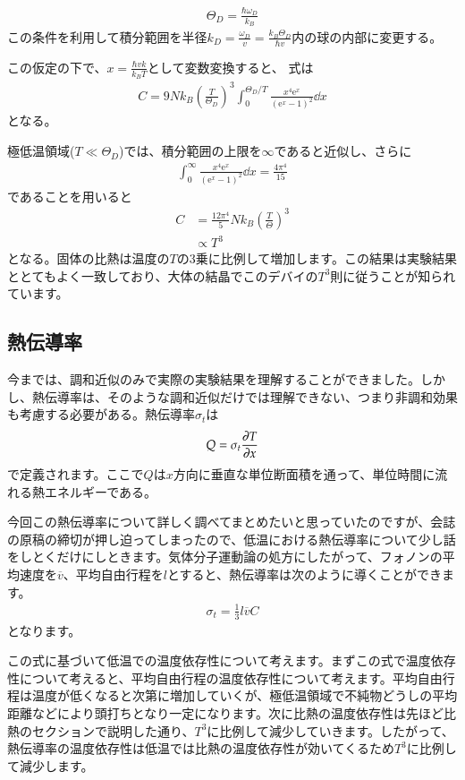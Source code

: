 \documentclass[10pt,b5paper,papersize,dvipdfmx]{jsbook}
\begin{document}
\begin{align}
  \Theta_D = \frac{\hbar \omega_D}{k_B}
\end{align}
この条件を利用して積分範囲を半径$k_D=\frac{\omega_D}{v} = \frac{k_B\Theta_D}{\hbar v}$内の球の内部に変更する。\par
この仮定の下で、$x = \frac{\hbar v k}{k_B T}$として変数変換すると、 式は
\begin{align}
  C = 9Nk_B\left(\frac{T}{\Theta_D}\right)^3\int_0^{\Theta_D/T}\frac{x^4\mathrm{e}^x}{(\mathrm{e}^x -1)^2}\dd{x}
\end{align}
となる。\par
極低温領域($T \ll \Theta_D$)では、積分範囲の上限を$\infty$であると近似し、さらに
\begin{align}
  \int_0^\infty \frac{x^4 \mathrm{e}^x}{(\mathrm{e}^x-1)^2}\dd{x} = \frac{4\pi^4}{15}
\end{align}
であることを用いると
\begin{align}
  C &= \frac{12\pi^4}{5}Nk_B\left(\frac{T}{\Theta}\right)^3 \\
  &\propto T^3  
\end{align}
となる。固体の比熱は温度の$T$の3乗に比例して増加します。この結果は実験結果ととてもよく一致しており、大体の結晶でこのデバイの$T^3$則に従うことが知られています。
\subsection{熱伝導率}
今までは、調和近似のみで実際の実験結果を理解することができました。しかし、熱伝導率は、そのような調和近似だけでは理解できない、つまり非調和効果も考慮する必要がある。熱伝導率$\sigma_t$は
\begin{align}
  Q = \sigma_t \pdv {T}{x}
\end{align}
で定義されます。ここで$Q$は$x$方向に垂直な単位断面積を通って、単位時間に流れる熱エネルギーである。\par
今回この熱伝導率について詳しく調べてまとめたいと思っていたのですが、会誌の原稿の締切が押し迫ってしまったので、低温における熱伝導率について少し話をしとくだけにしときます。気体分子運動論の処方にしたがって、フォノンの平均速度を$\overline{v}$、平均自由行程を$l$とすると、熱伝導率は次のように導くことができます。
\begin{align}
  \sigma_t = \frac{1}{3}l\overline{v}C
\end{align}
となります。\par
この式に基づいて低温での温度依存性について考えます。まずこの式で温度依存性について考えると、平均自由行程の温度依存性について考えます。平均自由行程は温度が低くなると次第に増加していくが、極低温領域で不純物どうしの平均距離などにより頭打ちとなり一定になります。次に比熱の温度依存性は先ほど比熱のセクションで説明した通り、$T^3$に比例して減少していきます。したがって、熱伝導率の温度依存性は低温では比熱の温度依存性が効いてくるため$T^3$に比例して減少します。
\end{document}
